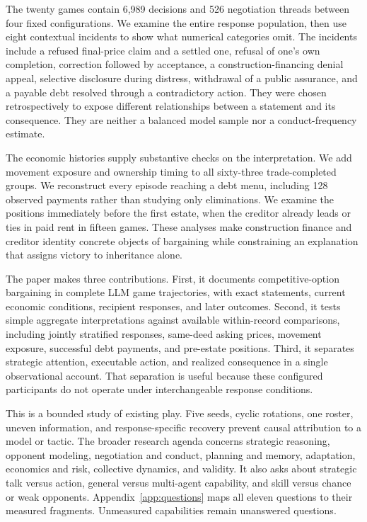 The twenty games contain 6,989 decisions and 526 negotiation threads between four fixed configurations. We examine the entire response population, then use eight contextual incidents to show what numerical categories omit. The incidents include a refused final-price claim and a settled one, refusal of one's own completion, correction followed by acceptance, a construction-financing denial appeal, selective disclosure during distress, withdrawal of a public assurance, and a payable debt resolved through a contradictory action. They were chosen retrospectively to expose different relationships between a statement and its consequence. They are neither a balanced model sample nor a conduct-frequency estimate.

The economic histories supply substantive checks on the interpretation. We add movement exposure and ownership timing to all sixty-three trade-completed groups. We reconstruct every episode reaching a debt menu, including 128 observed payments rather than studying only eliminations. We examine the positions immediately before the first estate, when the creditor already leads or ties in paid rent in fifteen games. These analyses make construction finance and creditor identity concrete objects of bargaining while constraining an explanation that assigns victory to inheritance alone.

The paper makes three contributions. First, it documents competitive-option bargaining in complete LLM game trajectories, with exact statements, current economic conditions, recipient responses, and later outcomes. Second, it tests simple aggregate interpretations against available within-record comparisons, including jointly stratified responses, same-deed asking prices, movement exposure, successful debt payments, and pre-estate positions. Third, it separates strategic attention, executable action, and realized consequence in a single observational account. That separation is useful because these configured participants do not operate under interchangeable response conditions.

This is a bounded study of existing play. Five seeds, cyclic rotations, one roster, uneven information, and response-specific recovery prevent causal attribution to a model or tactic. The broader research agenda concerns strategic reasoning, opponent modeling, negotiation and conduct, planning and memory, adaptation, economics and risk, collective dynamics, and validity. It also asks about strategic talk versus action, general versus multi-agent capability, and skill versus chance or weak opponents. Appendix~\ref{app:questions} maps all eleven questions to their measured fragments. Unmeasured capabilities remain unanswered questions.
